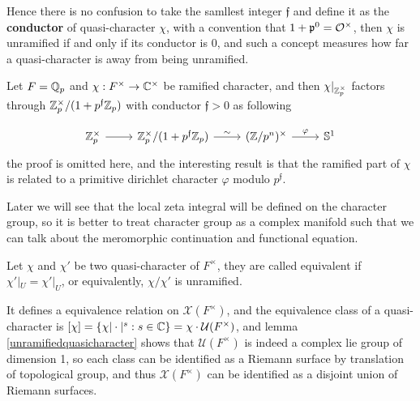 Hence there is no confusion to take the samllest integer \(\mathfrak{f}\) and define it as the \textbf{conductor} of quasi-character \(\chi\), with a convention that \(1+\mathfrak{p}^0 = \mathcal{O}^\times\), then \(\chi\) is unramified if and only if its conductor is \(0\), and such a concept measures how far a quasi-character is away from being unramified.

\begin{remark}
    Let \(F = \mathbb{Q}_p\) and \(\chi: F^\times \to \mathbb{C}^\times\) be ramified character, and then \(\chi|_{\mathbb{Z}_p^\times}\) factors through \(\mathbb{Z}_p^\times/(1+p^\mathfrak{f}\mathbb{Z}_p)\) with conductor \(\mathfrak{f} > 0\) as following

\[\begin{tikzcd}
	{\zz_p^\times} & {\zz_p^\times/(1+p^\mathfrak{f}\zz_p)} & {(\zz/p^n)^\times} & {\mathbb{S}^1}
	\arrow[from=1-1, to=1-2]
	\arrow["\sim", from=1-2, to=1-3]
	\arrow["\varphi", from=1-3, to=1-4]
\end{tikzcd}\]
    the proof is omitted here, and the interesting result is that the ramified part of \(\chi\) is related to a primitive dirichlet character \(\varphi\) modulo \(p^{\mathfrak{f}}\). 
\end{remark}





Later we will see that the local zeta integral will be defined on the character group, so it is better to treat character group as a complex manifold such that we can talk about the meromorphic continuation and functional equation.

\begin{definition}
    Let \(\chi\) and \(\chi'\) be two quasi-character of \(F^\times\), they are called equivalent if \(\chi'|_U = \chi'|_U\), or equivalently, \(\chi/\chi'\) is unramified.
\end{definition}

    It defines a equivalence relation on \(\mathcal{X}(F^\times)\), and the equivalence class of a quasi-character is \([\chi] = \{\chi|\cdot|^s : s \in \mathbb{C}\} = \chi \cdot \mathcal{U}(F^\times)\), and lemma \ref{unramifiedquasicharacter} shows that \(\mathcal{U}(F^\times)\) is indeed a complex lie group of dimension 1, so each class can be identified as a Riemann surface by translation of topological group, and thus \(\mathcal{X}(F^\times)\) can be identified as a disjoint union of Riemann surfaces.

